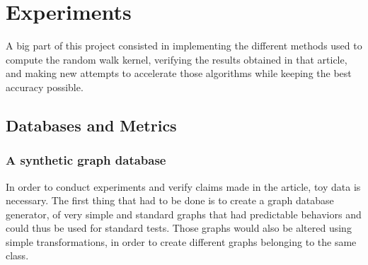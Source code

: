 \documentclass{article}
\theoremstyle{definition}
\begin{document}
\newpage
\section{Experiments}
A big part of this project consisted in implementing the different methods used to compute the random walk kernel\cite{vishwanathan_graph_2010}, verifying the results obtained in that article, and making new attempts to accelerate those algorithms while keeping the best accuracy possible.
\subsection{Databases and Metrics}
\subsubsection{A synthetic graph database}
In order to conduct experiments and verify claims made in the article, toy data is necessary. The first thing that had to be done is to create a graph database generator, of very simple and standard graphs that had predictable behaviors and could thus be used for standard tests. Those graphs would also be altered using simple transformations, in order to create different graphs belonging to the same class.
\end{document}
